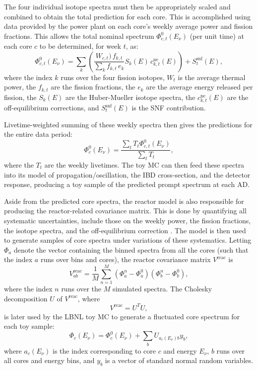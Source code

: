 \documentclass[../thesis.tex]{subfiles}
\begin{document}
The four individual isotope spectra must then be appropriately scaled and combined to obtain the total prediction for each core. This is accomplished using data provided by the power plant on each core's weekly average power and fission fractions. This allows the total nominal spectrum $\Phi^0_{c,t}(E_\nu)$ (per unit time) at each core $c$ to be determined, for week $t$, as:
\begin{equation}
  \Phi^0_{c,t}(E_\nu) = \sum_k \left( \frac{W_{c,t}) \, f_{k,t}}{\sum_k f_{k,t} \, e_k}
    S_k(E) \, c^{\mathrm{ne}}_{k,t}(E) \right) + S^{\mathrm{snf}}_t(E),
\end{equation}
where the index $k$ runs over the four fission isotopes, $W_t$ is the average thermal power, the $f_{k,t}$ are the fission fractions, the $e_k$ are the average energy released per fission, the $S_k(E)$ are the Huber-Mueller isotope spectra, the $c^{\mathrm{ne}}_{k,t}(E)$ are the off-equilibrium corrections, and $S^{\mathrm{snf}}_t(E)$ is the SNF contribution.

Livetime-weighted summing of these weekly spectra then gives the predictions for the entire data period:
\begin{equation}
  \Phi^0_c(E_\nu) = \frac{\sum_t T_t \Phi^0_{c,t}(E_\nu)}{\sum_t T_t},
\end{equation}
where the $T_t$ are the weekly livetimes. The toy MC can then feed these spectra into its model of propagation/oscillation, the IBD cross-section, and the detector response, producing a toy sample of the predicted prompt spectrum at each AD.

Aside from the predicted core spectra, the reactor model is also responsible for producing the reactor-related covariance matrix. This is done by quantifying all systematic uncertainties, include those on the weekly power, the fission fractions, the isotope spectra, and the off-equilibrium correction \cite{Lewis}. The model is then used to generate samples of core spectra under variations of these systematics. Letting $\Phi_{a}$ denote the vector containing the binned spectra from all the cores (such that the index $a$ runs over bins and cores), the reactor covariance matrix $V^{\mathrm{reac}}$ is
\begin{equation}
  V^{\mathrm{reac}}_{ab} = \frac{1}{M} \sum_{n=1}^M(\Phi^n_{a} - \Phi^0_{a})(\Phi^n_{b} - \Phi^0_{b}),
\end{equation}
where the index $n$ runs over the $M$ simulated spectra. The Cholesky decomposition $U$ of $V^{\mathrm{reac}}$, where
\begin{equation}
  V^{\mathrm{reac}} = U^TU,
\end{equation}
is later used by the LBNL toy MC to generate a fluctuated core spectrum for each toy sample:
\begin{equation}
  \label{eq:fitCholeskyUsage}
  \Phi_c(E_\nu) = \Phi^0_c(E_\nu) + \sum_b U_{a_c(E_\nu)b} y_b,
\end{equation}
where $a_c(E_\nu)$ is the index corresponding to core $c$ and energy $E_\nu$, $b$ runs over all cores and energy bins, and $y_b$ is a vector of standard normal random variables.
\end{document}
